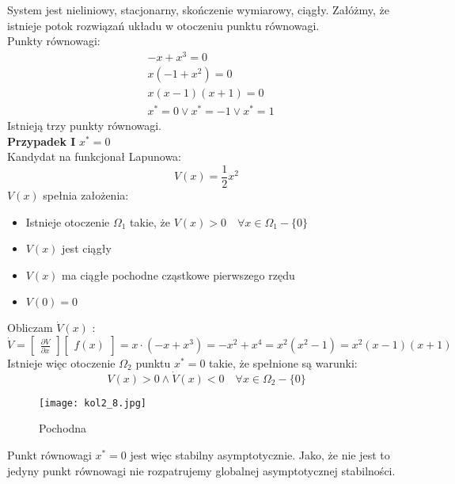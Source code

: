 \documentclass[a4paper,11pt]{article}
\begin{document}
System jest nieliniowy, stacjonarny, skończenie wymiarowy, ciągły. Załóżmy, że istnieje potok rozwiązań układu w otoczeniu punktu równowagi. \\
Punkty równowagi:
\begin{align*}
& -x+x^{3} = 0 \\
& x(-1+x^{2}) = 0 \\
& x(x-1)(x+1) = 0 \\
& x^{*} = 0 \lor x^{*} = -1 \lor x^{*} = 1 
\end{align*}
Istnieją trzy punkty równowagi. \\
\textbf{Przypadek I} \( x^{*} = 0 \) \\
Kandydat na funkcjonał Lapunowa:  
\begin{equation*}
V(x)=\frac{1}{2}x^{2}
\end{equation*}
\(V(x)\) spełnia założenia:
\begin{itemize}
\item Istnieje otoczenie \( \Omega_{1} \) takie, że $ V(x) > 0 \quad \forall x \in \Omega_{1} - \{0\} $
\item $ V(x) $ jest ciągły
\item $ V(x) $ ma ciągłe pochodne cząstkowe pierwszego rzędu
\item $ V(0) = 0 $
\end{itemize}
Obliczam \( \dot{V}(x) \) : \\
\begin{equation*}
\dot{V} = 
\begin{bmatrix}
\frac{\partial V}{\partial x}
\end{bmatrix}
\begin{bmatrix}
f(x)
\end{bmatrix}
=
x \cdot (-x+x^{3}) = -x^{2}+x^{4} = x^{2}(x^{2}-1) = x^{2}(x-1)(x+1)
\end{equation*}
Istnieje więc otoczenie \( \Omega_{2} \) punktu \( x^{*} = 0 \) takie, że spełnione są warunki: 
\begin{equation*}
V(x)>0 \land \dot{V}(x) < 0 \quad \forall x \in \Omega_{2} - \{0\}
\end{equation*}
\begin{figure}[H]
\centerline{\texttt{[image: kol2\_8.jpg]}}
\caption{Pochodna}
\label{fig:kol2_8}
\end{figure}
Punkt równowagi \( x^{*}=0 \) jest więc stabilny asymptotycznie. Jako, że nie jest to jedyny punkt równowagi nie rozpatrujemy globalnej asymptotycznej stabilności.
\end{document}
